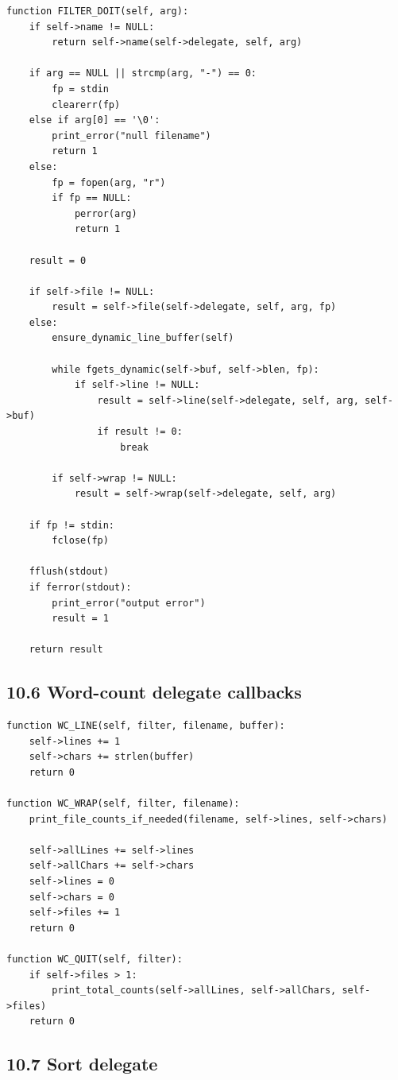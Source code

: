 \documentclass[11pt]{article}
\begin{document}
\begin{verbatim}
function FILTER_DOIT(self, arg):
    if self->name != NULL:
        return self->name(self->delegate, self, arg)

    if arg == NULL || strcmp(arg, "-") == 0:
        fp = stdin
        clearerr(fp)
    else if arg[0] == '\0':
        print_error("null filename")
        return 1
    else:
        fp = fopen(arg, "r")
        if fp == NULL:
            perror(arg)
            return 1

    result = 0

    if self->file != NULL:
        result = self->file(self->delegate, self, arg, fp)
    else:
        ensure_dynamic_line_buffer(self)

        while fgets_dynamic(self->buf, self->blen, fp):
            if self->line != NULL:
                result = self->line(self->delegate, self, arg, self->buf)
                if result != 0:
                    break

        if self->wrap != NULL:
            result = self->wrap(self->delegate, self, arg)

    if fp != stdin:
        fclose(fp)

    fflush(stdout)
    if ferror(stdout):
        print_error("output error")
        result = 1

    return result
\end{verbatim}

\subsection{10.6 Word-count delegate
callbacks}\label{word-count-delegate-callbacks}

\begin{verbatim}
function WC_LINE(self, filter, filename, buffer):
    self->lines += 1
    self->chars += strlen(buffer)
    return 0

function WC_WRAP(self, filter, filename):
    print_file_counts_if_needed(filename, self->lines, self->chars)

    self->allLines += self->lines
    self->allChars += self->chars
    self->lines = 0
    self->chars = 0
    self->files += 1
    return 0

function WC_QUIT(self, filter):
    if self->files > 1:
        print_total_counts(self->allLines, self->allChars, self->files)
    return 0
\end{verbatim}

\subsection{10.7 Sort delegate}\label{sort-delegate}
\end{document}
